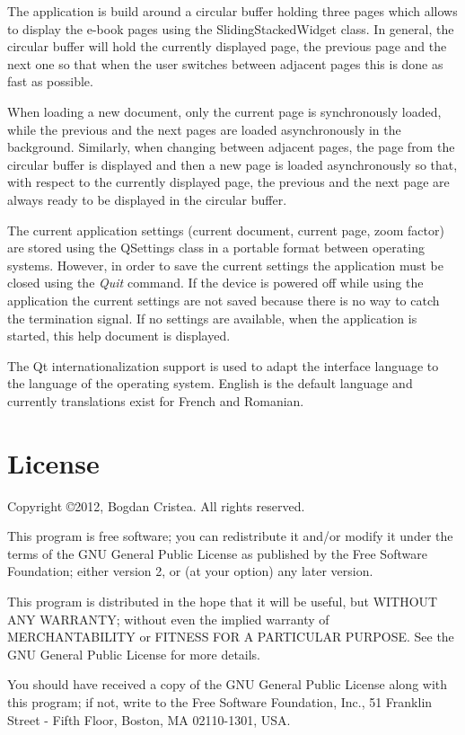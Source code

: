 \documentclass[journal,12pt]{IEEEtran}
\begin{document}
The application is build around a circular buffer holding three pages which allows to display the e-book pages using the \textrm{SlidingStackedWidget} class. In general, the circular buffer will hold the currently displayed page, the previous page and the next one so that when the user switches between adjacent pages this is done as fast as possible. 

When loading a new document, only the current page is synchronously loaded, while the previous and the next pages are loaded asynchronously in the background. Similarly, when changing between adjacent pages, the page from the circular buffer is displayed and then a new page is loaded asynchronously so that, with respect to the currently displayed page, the previous and the next page are always ready to be displayed in the circular buffer.

The current application settings (current document, current page, zoom factor) are stored using the \textrm{QSettings} class in a portable format between operating systems. However, in order to save the current settings the application must be closed using the \textit{Quit} command. If the device is powered off while using the application the current settings are not saved because there is no way to catch the termination signal. If no settings are available, when the application is started, this help document is displayed.

The Qt internationalization support is used to adapt the interface language to the language of the operating system. English is the default language and currently translations exist for French and Romanian.

\section{License}
 Copyright \copyright 2012, Bogdan Cristea. All rights reserved.
 
 This program is free software; you can redistribute it and/or modify  it under the terms of the GNU General Public License as published by  the Free Software Foundation; either version 2, or (at your option)  any later version.
 
 This program is distributed in the hope that it will be useful,  but WITHOUT ANY WARRANTY; without even the implied warranty of
 MERCHANTABILITY or FITNESS FOR A PARTICULAR PURPOSE.  See the  GNU General Public License for more details.
 
 You should have received a copy of the GNU General Public License along with this program; if not, write to the Free Software
 Foundation, Inc., 51 Franklin Street - Fifth Floor, Boston, MA 02110-1301, USA.
\end{document}
